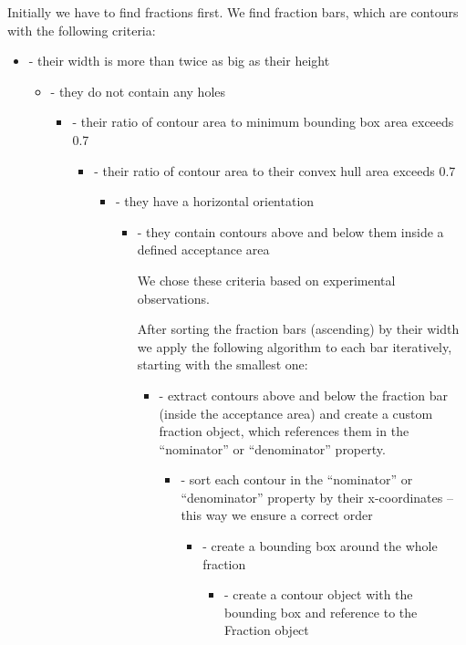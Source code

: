 \documentclass[12pt]{article}
\begin{document}
	Initially we have to find fractions first. We find fraction bars, which are contours with the following criteria:
	\begin{itemize}
	\item - their width is more than twice as big as their height
	\begin{itemize}
	\item - they do not contain any holes
	\begin{itemize}
	\item - their ratio of contour area to minimum bounding box area exceeds 0.7
	\begin{itemize}
	\item - their ratio of contour area to their convex hull area exceeds 0.7
	\begin{itemize}
	\item - they have a horizontal orientation
	\begin{itemize}
	\item - they contain contours above and below them inside a defined acceptance area

	We chose these criteria based on experimental observations.

	After sorting the fraction bars (ascending) by their width we apply the following algorithm to each bar iteratively, starting with the smallest one:
	\begin{itemize}
	\item - extract contours above and below the fraction bar (inside the acceptance area) and create a custom fraction object, which references them in the “nominator” or “denominator” property.
	\begin{itemize}
	\item - sort each contour in the “nominator” or “denominator” property by their x-coordinates – this way we ensure a correct order
	\begin{itemize}
	\item - create a bounding box around the whole fraction
	\begin{itemize}
	\item - create a contour object with the bounding box and reference to the Fraction object


\end{itemize}
\end{itemize}
\end{itemize}
\end{itemize}
\end{itemize}
\end{itemize}
\end{itemize}
\end{itemize}
\end{itemize}
\end{itemize}
\end{document}
